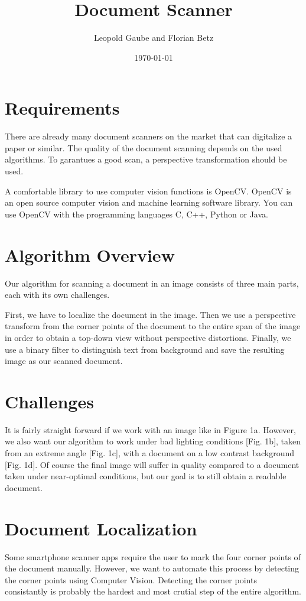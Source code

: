 \documentclass[bibliography=totoc]{scrartcl}
\title{Document Scanner}
\author{Leopold Gaube and Florian Betz}
\date{\today}
\begin{document}
	\maketitle
	\tableofcontents

	\clearpage

	\section{Requirements}
	There are already many document scanners on the market that can digitalize a paper or similar. 
	The quality of the document scanning depends on the used algorithms.
	To garantues a good scan, a perspective transformation should be used.
	
	A comfortable library to use computer vision functions is \ac{OpenCV}.
	\ac{OpenCV} is an open source computer vision and machine learning software library. \cite{OpenCV}
	You can use OpenCV with the programming languages C, C++, Python or Java.
	

    \section{Algorithm Overview}
	Our algorithm for scanning a document in an image consists of three main parts, each with its own challenges.
	
	First, we have to localize the document in the image. 
	Then we use a perspective transform from the corner points of the document to the entire span of the image in order to obtain a top-down view without perspective distortions.
	Finally, we use a binary filter to distinguish text from background and save the resulting image as our scanned document.

	\section{Challenges}
	It is fairly straight forward if we work with an image like in Figure 1a.
	However, we also want our algorithm to work under bad lighting conditions [Fig. 1b], taken from an extreme angle [Fig. 1c], with a document on a low contrast background [Fig. 1d].
	Of course the final image will suffer in quality compared to a document taken under near-optimal conditions, but our goal is to still obtain a readable document.
	
	\section{Document Localization}
	Some smartphone scanner apps require the user to mark the four corner points of the document manually. 
	However, we want to automate this process by detecting the corner points using Computer Vision.
	Detecting the corner points consistantly is probably the hardest and most crutial step of the entire algorithm. 
	
\end{document}
